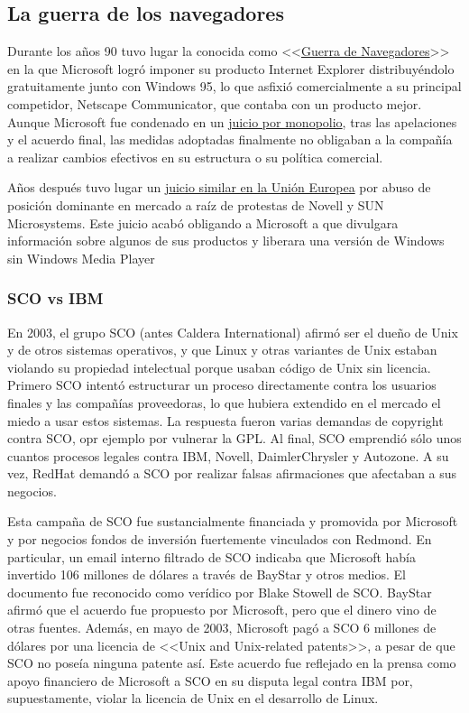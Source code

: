 \subsection{La guerra de los navegadores}
Durante los años 90 tuvo lugar la conocida como <<\href{https://es.wikipedia.org/wiki/guerra_de_navegadores}{Guerra de Navegadores}>>\cite{wiki:guerra_navegadores_2020} en la que Microsoft logró imponer su producto Internet Explorer distribuyéndolo gratuitamente junto con Windows 95, lo que asfixió comercialmente a su principal competidor, Netscape Communicator, que contaba con un producto mejor. Aunque Microsoft fue condenado en un \href{https://es.wikipedia.org/wiki/Caso_Estados_Unidos_contra_Microsoft}{juicio por monopolio}\cite{wiki:juicio_microsoft_2020}, tras las apelaciones y el acuerdo final, las medidas adoptadas finalmente no obligaban a la compañía a realizar cambios efectivos en su estructura o su política comercial.\cite{thotw_2019:Browser_Wars}

Años después tuvo lugar un \href{https://en.wikipedia.org/wiki/Microsoft_Corp._v._Commission}{juicio similar en la Unión Europea}\cite{wiki_2020:microsoft_v_commision} por abuso de posición dominante en mercado a raíz de protestas de Novell y SUN Microsystems. Este juicio acabó obligando a Microsoft a que divulgara información sobre algunos de sus productos y liberara una versión de Windows sin Windows Media Player

\subsubsection{SCO vs IBM}
En 2003, el grupo SCO (antes Caldera International) afirmó ser el dueño de Unix y de otros sistemas operativos, y que Linux y otras variantes de Unix estaban violando su propiedad intelectual porque usaban código de Unix sin licencia. Primero SCO intentó estructurar un proceso directamente contra los usuarios finales y las compañías proveedoras, lo que hubiera extendido en el mercado el miedo a usar estos sistemas. La respuesta fueron varias demandas de copyright contra SCO, opr ejemplo por vulnerar la GPL. Al final, SCO emprendió sólo unos cuantos procesos legales contra IBM, Novell, DaimlerChrysler y Autozone. A su vez, RedHat demandó a SCO por realizar falsas afirmaciones que afectaban a sus negocios. \cite{wiki_2019:sco_linux}

Esta campaña de SCO fue sustancialmente financiada y promovida por Microsoft y por negocios fondos de inversión fuertemente vinculados con Redmond. En particular, un email interno filtrado de SCO indicaba que Microsoft había invertido 106 millones de dólares a través de BayStar y otros medios. El documento fue reconocido como verídico por Blake Stowell de SCO. BayStar afirmó que el acuerdo fue propuesto por Microsoft, pero que el dinero vino de otras fuentes. Además, en mayo de 2003, Microsoft pagó a SCO 6 millones de dólares por una licencia de <<Unix and Unix-related patents>>, a pesar de que SCO no poseía ninguna patente así. Este acuerdo fue reflejado en la prensa como apoyo financiero de Microsoft a SCO en su disputa legal contra IBM por, supuestamente, violar la licencia de Unix en el desarrollo de Linux.\cite{wiki_2019:sco_linux_microsoft_controverse}

